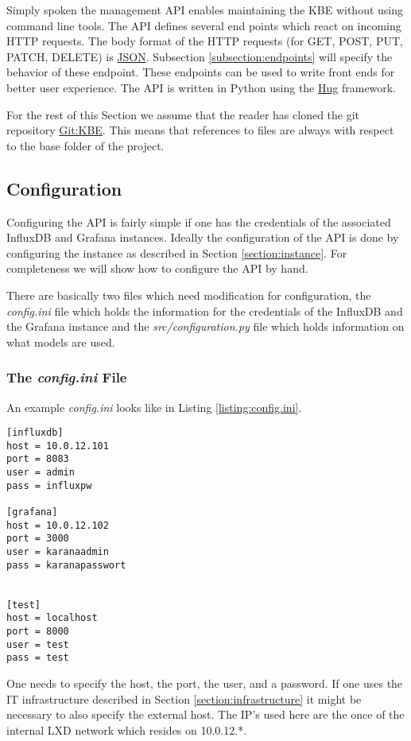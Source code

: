 \lstset{language=Python}          %
Simply spoken the management API enables maintaining the KBE without using command line tools. The API defines several end points which react on incoming HTTP requests. The body format of the HTTP requests (for GET, POST, PUT, PATCH, DELETE) is \href{http://json.org/}{JSON}. Subsection \ref{subsection:endpoints} will specify the behavior of these endpoint. These endpoints can be used to write front ends for better user experience. 
The API is written in Python using the \href{http://www.hug.rest/}{Hug} framework.

For the rest of this Section we assume that the reader has cloned the git repository \href{http://gitlab.me-soldesign.com/karana/backend-api.git}{Git:KBE}. This means that references to files are always with respect to the base folder of the project. 

\subsection{Configuration}
Configuring the API is fairly simple if one has the credentials of the associated InfluxDB and Grafana instances. Ideally the configuration of the API is done by configuring the instance as described in Section \ref{section:instance}. For completeness we will show how to configure the API by hand. 

There are basically two files which need modification for configuration, the \textit{config.ini} file which holds the information for the credentials of the InfluxDB and the Grafana instance and the \textit{src/configuration.py} file which holds information on what models are used.

\subsubsection{The \textit{config.ini} File}
An example  \textit{config.ini} looks like in Listing \ref{listing:config.ini}.
\lstset{language=XML}  
\begin{lstlisting}[caption={Example of a \textit{config.ini} file},label={listing:config.ini}]
[influxdb]
host = 10.0.12.101
port = 8083
user = admin
pass = influxpw

[grafana]
host = 10.0.12.102
port = 3000
user = karanaadmin
pass = karanapasswort


[test]
host = localhost
port = 8000
user = test
pass = test
\end{lstlisting}
One needs to specify the host, the port, the user, and a password. If one uses the IT infrastructure described in Section \ref{section:infrastructure} it might be necessary to also specify the external host. The IP's used here are the once of the internal LXD network which resides on 10.0.12.*.

